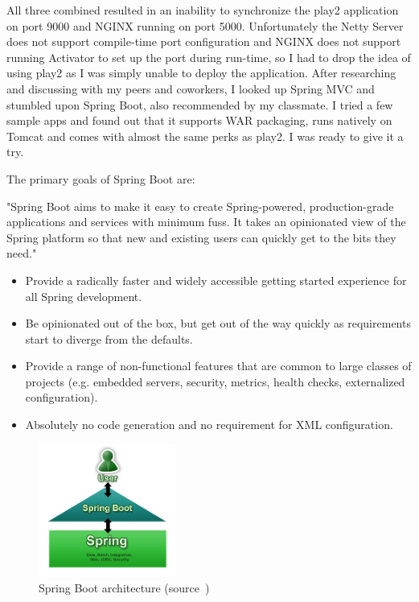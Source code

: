 All three combined resulted in an inability to synchronize the play2 application on port 9000 and NGINX running on port 5000. Unfortunately the Netty Server does not support compile-time port configuration and NGINX does not support running Activator to set up the port during run-time, so I had to drop the idea of using play2 as I was simply unable to deploy the application. After researching and discussing with my peers and coworkers, I looked up Spring MVC and stumbled upon Spring Boot, also recommended by my classmate. I tried a few sample apps and found out that it supports WAR packaging, runs natively on Tomcat and comes with almost the same perks as play2. I was ready to give it a try.

The primary goals of Spring Boot are:

"Spring Boot aims to make it easy to create Spring-powered, production-grade applications and services with minimum fuss. It takes an opinionated view of the Spring platform so that new and existing users can quickly get to the bits they need." \cite{spring-boot-blog}

\begin{itemize}
	\item Provide a radically faster and widely accessible getting started experience for all Spring development.
	\item Be opinionated out of the box, but get out of the way quickly as requirements start to diverge from the defaults.
	\item Provide a range of non-functional features that are common to large classes of projects (e.g. embedded servers, security, metrics, health checks, externalized configuration).
	\item Absolutely no code generation and no requirement for XML configuration.
\end{itemize}

\begin{figure}[!ht]
	\centering
	\includegraphics[width=0.4\textwidth]{figures/04_implementation/spring}
    \caption[Spring Boot architecture]{Spring Boot architecture (source~\protect\cite{spring-boot-doc})}
\end{figure}

